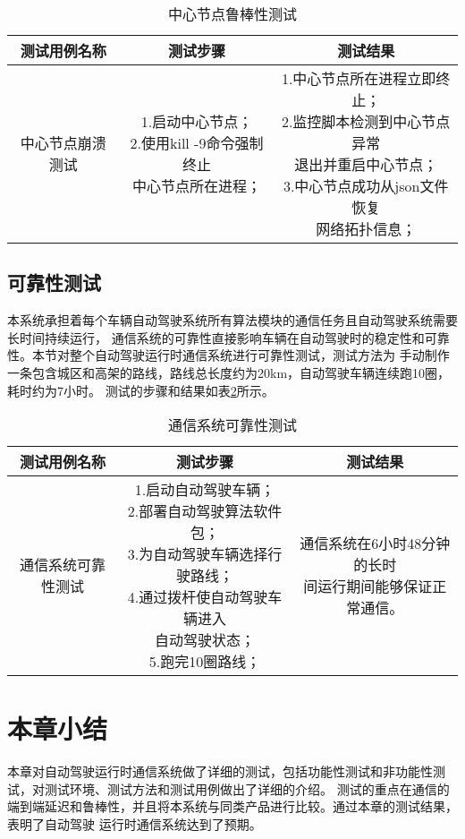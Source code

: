 \begin{table}[H]
  \centering\small
  \caption{中心节点鲁棒性测试}
  \renewcommand\arraystretch{1.2}
  \label{master_robust}
  \begin{tabular}{ccc}
    \toprule
    测试用例名称 & 测试步骤 & 测试结果 \\
    \midrule
    中心节点崩溃测试 & \makecell[l]{1.启动中心节点；\\2.使用kill -9命令强制终止\\中心节点所在进程；} & \makecell[l]{1.中心节点所在进程立即终止；\\2.监控脚本检测到中心节点异常\\退出并重启中心节点；\\3.中心节点成功从json文件恢复\\网络拓扑信息；}\\
    \bottomrule
  \end{tabular}
\end{table}

\subsection{可靠性测试}
本系统承担着每个车辆自动驾驶系统所有算法模块的通信任务且自动驾驶系统需要长时间持续运行，
通信系统的可靠性直接影响车辆在自动驾驶时的稳定性和可靠性。本节对整个自动驾驶运行时通信系统进行可靠性测试，测试方法为
手动制作一条包含城区和高架的路线，路线总长度约为20km，自动驾驶车辆连续跑10圈，耗时约为7小时。
测试的步骤和结果如表\ref{system_reliable}所示。

\begin{table}[H]
  \centering\small
  \caption{通信系统可靠性测试}
  \renewcommand\arraystretch{1.2}
  \label{system_reliable}
  \begin{tabular}{ccc}
    \toprule
    测试用例名称 & 测试步骤 & 测试结果 \\
    \midrule
    通信系统可靠性测试 & \makecell[l]{1.启动自动驾驶车辆；\\2.部署自动驾驶算法软件包；\\3.为自动驾驶车辆选择行驶路线；\\4.通过拨杆使自动驾驶车辆进入\\自动驾驶状态；\\5.跑完10圈路线；} & \makecell[l]{通信系统在6小时48分钟的长时\\间运行期间能够保证正常通信。\\}\\
    \bottomrule
  \end{tabular}
\end{table}

\section{本章小结}
本章对自动驾驶运行时通信系统做了详细的测试，包括功能性测试和非功能性测试，对测试环境、测试方法和测试用例做出了详细的介绍。
测试的重点在通信的端到端延迟和鲁棒性，并且将本系统与同类产品进行比较。通过本章的测试结果，表明了自动驾驶
运行时通信系统达到了预期。
